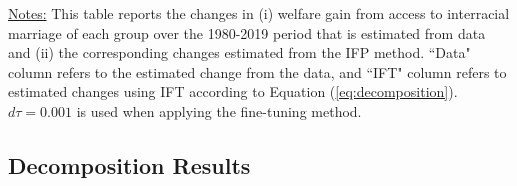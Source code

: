\begin{table}[H] \caption{Data vs. IFT: 1980-2019 Changes in Welfare Gains from Interracial Marriage} \label{tab:comparedgains}
\begin{center}
\begin{minipage}{14cm}
\begin{spacing}{0.9}
{\footnotesize{\underline{Notes:} This table reports the changes in (i) welfare gain from access to interracial marriage of each group over the 1980-2019 period that is estimated from data and (ii) the corresponding changes estimated from the IFP method.  ``Data" column refers to the estimated change from the data, and ``IFT" column refers to estimated changes using IFT according to Equation (\ref{eq:decomposition}). $d\tau = 0.001$ is used when applying the fine-tuning method. }}
\end{spacing}
\end{minipage}
\end{center}
\end{table}

\vspace{-4ex}



\subsection{Decomposition Results}

